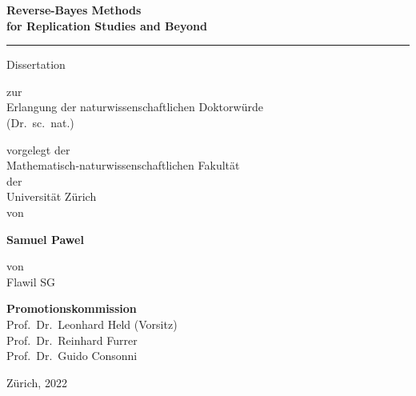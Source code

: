\documentclass[fontsize=14pt]{scrreprt}
\begin{document}
\begin{titlepage}
\enlargethispage{\baselineskip}
\centering

{\sffamily
{\Large \textbf{Reverse-Bayes Methods \medskip\\ for Replication Studies and Beyond}}

\vspace*{1.5cm}
\hrule
\vspace*{1.5cm}

{\large\sffamily Dissertation}

\vspace*{1cm}

zur\\
Erlangung der naturwissenschaftlichen Doktorwürde\\
(Dr.~sc.~nat.)

\vspace*{1cm}

vorgelegt der\\
Mathematisch-naturwissenschaftlichen Fakultät\\
der\\
Universität Zürich\\[1em]

von

\vspace*{1em}
{\large\sffamily \textbf{Samuel Pawel}}
\vspace*{1em}

von\\
Flawil SG

\vspace*{1.5cm}

{\bfseries\sffamily Promotionskommission}\\[1ex]
Prof.~Dr.~Leonhard Held (Vorsitz)\\
Prof.~Dr.~Reinhard Furrer\\
Prof.~Dr.~Guido Consonni

\vspace*{1.5cm}

Zürich, 2022
}
\end{titlepage}
\end{document}
